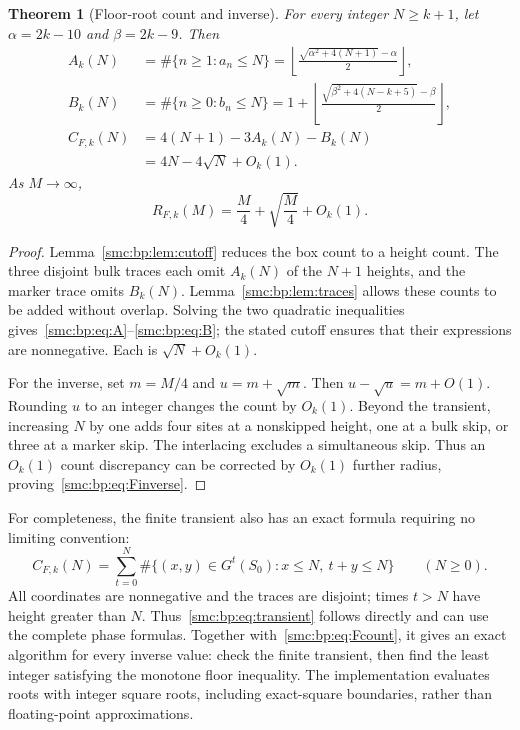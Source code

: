 \documentclass[11pt,letterpaper]{article}
\numberwithin{equation}{section}
\newtheorem{theorem}{Theorem}[section]
\theoremstyle{definition}
\theoremstyle{remark}
\begin{document}
\begin{theorem}[Floor-root count and inverse]\label{smc:bp:thm:Fcount}
For every integer $N\ge k+1$, let $\alpha=2k-10$ and $\beta=2k-9$. Then
\begin{align}
A_k(N)&=\#\{n\ge1:a_n\le N\}
=\left\lfloor\frac{\sqrt{\alpha^2+4(N+1)}-\alpha}{2}\right\rfloor,\label{smc:bp:eq:A}\\
B_k(N)&=\#\{n\ge0:b_n\le N\}
=1+\left\lfloor\frac{\sqrt{\beta^2+4(N-k+5)}-\beta}{2}\right\rfloor,\label{smc:bp:eq:B}\\
C_{F,k}(N)&=4(N+1)-3A_k(N)-B_k(N)\label{smc:bp:eq:Fcount}\\
&=4N-4\sqrt N+O_k(1).\nonumber
\end{align}
As $M\to\infty$,
\begin{equation}\label{smc:bp:eq:Finverse}
R_{F,k}(M)=\frac M4+\sqrt{\frac M4}+O_k(1).
\end{equation}
\end{theorem}
\begin{proof}
Lemma~\ref{smc:bp:lem:cutoff} reduces the box count to a height count. The three disjoint bulk traces each omit $A_k(N)$ of the $N+1$ heights, and the marker trace omits $B_k(N)$. Lemma~\ref{smc:bp:lem:traces} allows these counts to be added without overlap. Solving the two quadratic inequalities gives~\eqref{smc:bp:eq:A}--\eqref{smc:bp:eq:B}; the stated cutoff ensures that their expressions are nonnegative. Each is $\sqrt N+O_k(1)$.

For the inverse, set $m=M/4$ and $u=m+\sqrt m$. Then $u-\sqrt u=m+O(1)$. Rounding $u$ to an integer changes the count by $O_k(1)$. Beyond the transient, increasing $N$ by one adds four sites at a nonskipped height, one at a bulk skip, or three at a marker skip. The interlacing excludes a simultaneous skip. Thus an $O_k(1)$ count discrepancy can be corrected by $O_k(1)$ further radius, proving~\eqref{smc:bp:eq:Finverse}.
\end{proof}

For completeness, the finite transient also has an exact formula requiring no limiting convention:
\begin{equation}\label{smc:bp:eq:transient}
C_{F,k}(N)=\sum_{t=0}^N\#\{(x,y)\in G^t(S_0):x\le N,\ t+y\le N\}\qquad(N\ge0).
\end{equation}
All coordinates are nonnegative and the traces are disjoint; times $t>N$ have height greater than $N$. Thus~\eqref{smc:bp:eq:transient} follows directly and can use the complete phase formulas. Together with~\eqref{smc:bp:eq:Fcount}, it gives an exact algorithm for every inverse value: check the finite transient, then find the least integer satisfying the monotone floor inequality. The implementation evaluates roots with integer square roots, including exact-square boundaries, rather than floating-point approximations.
\end{document}
